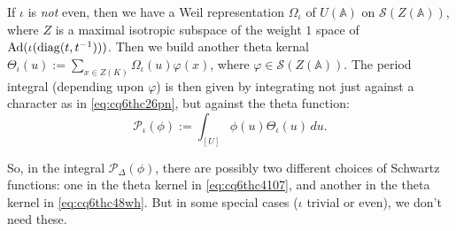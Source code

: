 \documentclass[reqno]{amsart} 
\numberwithin{theorem}{section}
\numberwithin{equation}{section}
\numberwithin{exercise}{section}
\begin{document}
\begin{enumerate}
  If $\iota$ is \emph{not} even, then we have a Weil representation $\Omega_\iota$ of $U(\mathbb{A})$ on $\mathcal{S}(Z(\mathbb{A}))$, where $Z$ is a maximal isotropic subspace of the weight $1$ space of $\operatorname{Ad}(\iota(\operatorname{diag}(t, t^{-1})))$.  Then we build another theta kernal $\Theta_\iota(u) := \sum_{x \in Z(K)} \Omega_\iota(u) \varphi(x)$, where $\varphi \in \mathcal{S}(Z(\mathbb{A}))$.  The period integral (depending upon $\varphi$) is then given by integrating not just against a character as in \eqref{eq:cq6thc26pn}, but against the theta function:
  \begin{equation}\label{eq:cq6thc48wh}
    \mathcal{P}_\iota(\phi) := \int_{[U]} \phi(u) \Theta_{\iota}(u) \, d u.
  \end{equation}

  So, in the integral $\mathcal{P}_\Delta(\phi)$, there are possibly two different choices of Schwartz functions: one in the theta kernel in \eqref{eq:cq6thc4107}, and another in the theta kernel in \eqref{eq:cq6thc48wh}.  But in some special cases ($\iota$ trivial or even), we don't need these.
\end{enumerate}
\end{document}
